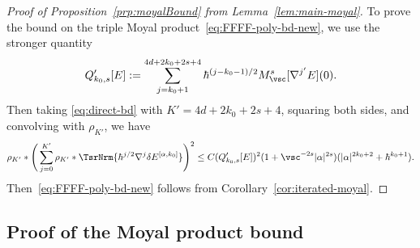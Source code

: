 \documentclass{article}
\numberwithin{equation}{section}
\begin{document}
\begin{proof}[Proof of Proposition~\ref{prp:moyalBound} from Lemma~\ref{lem:main-moyal}]
	To prove the bound on the triple Moyal product~\eqref{eq:FFFF-poly-bd-new},
	we use the stronger quantity
	\[
	Q'_{k_0,s}[E] := \sum_{j=k_0+1}^{4d+2k_0+2s+4} \hbar^{(j-k_0-1)/2}
	M_\vsc^s[\nabla^{j'}E](0).
	\]
	Then taking \eqref{eq:direct-bd} with  $K'=4d+2k_0+2s+4$, squaring both sides, and convolving with $\rho_{K'}$,  we have 
	\begin{equation}
		\rho_{K'}\ast \Bigg(\sum_{j=0}^{K'} \rho_{K'}\ast \TsrNrm{\hbar^{j/2}\nabla^j\delta E^{[\alpha,k_0]}}\Bigg)^2
		\leq C (Q'_{k_0,s}[E])^2 (1+\vsc^{-2s}|\alpha|^{2s})(|\alpha|^{2k_0+2} + \hbar^{k_0+1}).
	\end{equation}
	Then~\eqref{eq:FFFF-poly-bd-new} follows from Corollary~\ref{cor:iterated-moyal}.
\end{proof}

\subsection{Proof of the Moyal product bound}
\label{sec:proof}
\end{document}
